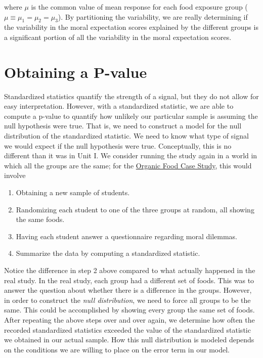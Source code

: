 \documentclass[
]{book}
\providecommand{\tightlist}{%
  \setlength{\itemsep}{0pt}\setlength{\parskip}{0pt}}
\theoremstyle{plain}
\theoremstyle{mydefn}
\theoremstyle{myexmpl}
\theoremstyle{remark}
\begin{document}
where \(\mu\) is the common value of mean response for each food exposure group (\(\mu \equiv \mu_1 = \mu_2 = \mu_3\)). By partitioning the variability, we are really determining if the variability in the moral expectation scores explained by the different groups is a significant portion of all the variability in the moral expectation scores.

\hypertarget{obtaining-a-p-value}{%
\section{Obtaining a P-value}\label{obtaining-a-p-value}}

Standardized statistics quantify the strength of a signal, but they do not allow for easy interpretation. However, with a standardized statistic, we are able to compute a p-value to quantify how unlikely our particular sample is assuming the null hypothesis were true. That is, we need to construct a model for the null distribution of the standardized statistic. We need to know what type of signal we would expect if the null hypothesis were true. Conceptually, this is no different than it was in Unit I. We consider running the study again in a world in which all the groups are the same; for the \protect\hyperlink{CaseOrganic}{Organic Food Case Study}, this would involve

\begin{enumerate}
\def\labelenumi{\arabic{enumi}.}
\tightlist
\item
  Obtaining a new sample of students.\\
\item
  Randomizing each student to one of the three groups at random, all showing the same foods.\\
\item
  Having each student answer a questionnaire regarding moral dilemmas.
\item
  Summarize the data by computing a standardized statistic.
\end{enumerate}

Notice the difference in step 2 above compared to what actually happened in the real study. In the real study, each group had a different set of foods. This was to answer the question about whether there is a difference in the groups. However, in order to construct the \emph{null distribution}, we need to force all groups to be the same. This could be accomplished by showing every group the same set of foods. After repeating the above steps over and over again, we determine how often the recorded standardized statistics exceeded the value of the standardized statistic we obtained in our actual sample. How this null distribution is modeled depends on the conditions we are willing to place on the error term in our model.
\end{document}

